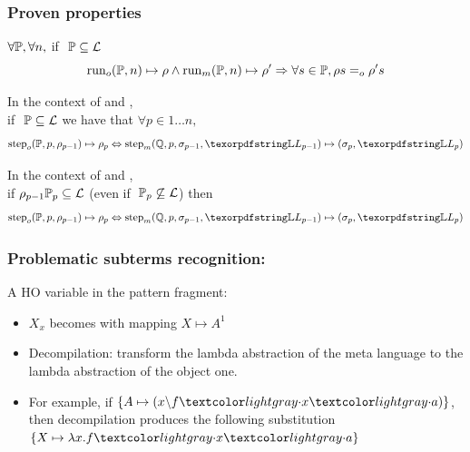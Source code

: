 \documentclass{pres}
\newtheorem{proposition}[theorem]{Proposition}
\begin{document}
\begin{frame}
  \frametitle{Proven properties}

  \begin{description}[]
    \item[Run Equivalence]
    $\forall \mathbb{P}, \forall n,$ if $~\mathbb{P} \subseteq \mathcal{L}$
    $$
      {\mathrm{run}}_o(\mathbb{P},n) \mapsto \rho \land
      {\mathrm{run}}_m(\mathbb{P},n) \mapsto \rho'
      \Rightarrow
      \forall s \in \mathbb{P}, \rho s =_o \rho' s
    $$
    \item [Simulation fidelity]
    In the context of  \frun and \hrun,\\
    if $~\mathbb{P} \subseteq \mathcal{L}$ we have that
    $\forall p \in 1 \ldots n,$
    $$\stepF{\foUnifPb}{p}{\rho_{p-1}}{\rho_p}
    \Leftrightarrow
    \stepH{\hoUnifPb}{p}{\sigma_{p-1}}{\linkStore_{p-1}}{\sigma_p}{\linkStore_p}
    $$
    \item[Fidelity ricovery]
    In the context of \frun and \hrun, \\
    if 
    $\rho_{p-1} \mathbb{P}_{p} \subseteq \mathcal{L}$ 
    (even if $\;\mathbb{P}_{p} \not\subseteq \mathcal{L}$)
    then\\
    $$
    \stepF{\foUnifPb}{p}{\rho_{p-1}}{\rho_p} \Leftrightarrow
    \stepH{\hoUnifPb}{p}{\sigma_{p-1}}{\linkStore_{p-1}}{\sigma_{p}}{\linkStore_p}
    $$
  \end{description}

\end{frame}

\begin{frame}
  \frametitle{Problematic subterms recognition: \maybebeta}

  A HO variable in the pattern fragment: 
  \begin{itemize}
    \item $X_x$ becomes  with mapping $X \mapsto A^1$
    \item Decompilation: transform the lambda abstraction of the meta language
          to the lambda abstraction of the object one.
    \item For example, if $\{A \mapsto (x\backslash f\appsep x\appsep a)\}$, then decompilation
          produces the following substitution $\{X \mapsto \lambda x.f\appsep x\appsep a\}$
  \end{itemize}

\end{frame}
\end{document}
